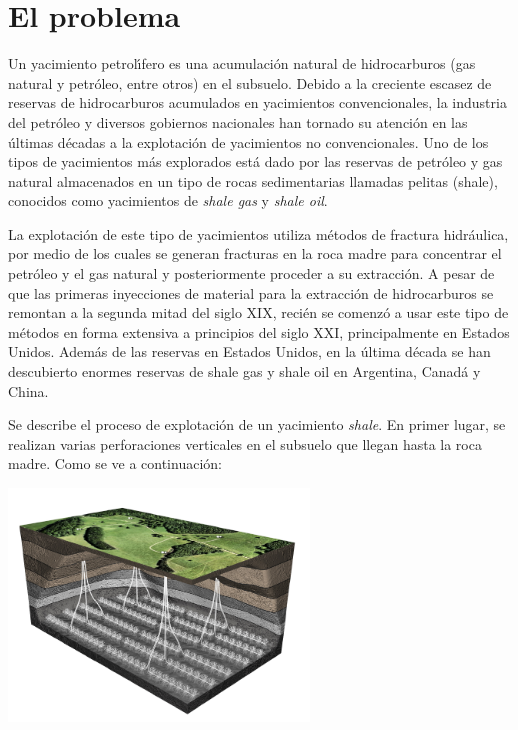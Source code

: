 \newpage
\section{El problema}\label{sec:problema}

Un yacimiento petrol\'\i fero es una acumulaci\'on natural de hidrocarburos (gas natural y petr\'oleo, entre otros) en el subsuelo. Debido a la creciente escasez de reservas de hidrocarburos acumulados en yacimientos convencionales, la industria del petr\'oleo y diversos gobiernos nacionales han tornado su atenci\'on en las \'ultimas d\'ecadas a la explotaci\'on de yacimientos no convencionales. Uno de los tipos de yacimientos m\'as explorados est\'a dado por las reservas de petr\'oleo y gas natural almacenados en un tipo de rocas sedimentarias llamadas pelitas (shale), conocidos como yacimientos de \emph{shale gas} y \emph{shale oil}.
 
La explotaci\'on de este tipo de yacimientos utiliza m\'etodos de fractura hidr\'aulica, por medio de los cuales se generan fracturas en la roca madre para concentrar el petr\'oleo y el gas natural y posteriormente proceder a su extracci\'on. A pesar de que las primeras inyecciones de material para la extracci\'on de hidrocarburos se remontan a la segunda mitad del siglo XIX, reci\'en se comenz\'o a usar este tipo de m\'etodos en forma extensiva a prin\-ci\-pios del siglo XXI, principalmente en Estados Unidos. Adem\'as de las reservas en Estados Unidos, en la \'ultima d\'ecada se han descubierto enormes reservas de shale gas y shale oil en Argentina, Canad\'a y China.

Se describe el proceso de explotaci\'on de un yacimiento \emph{shale}. En primer lugar, se realizan varias perforaciones verticales en el subsuelo que llegan hasta la roca madre. Como se ve a continuaci\'on:

\begin{center}
\includegraphics[width=0.6\textwidth]{imagenes/figura1}
\end{center}

